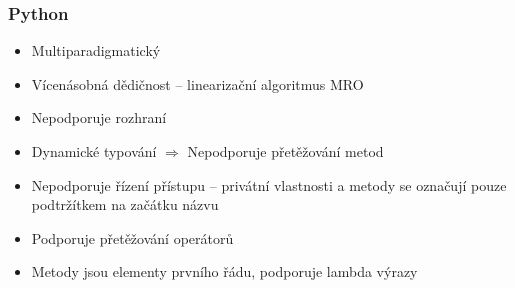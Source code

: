 \documentclass[10pt,a4paper]{article}
\begin{document}
		\subsubsection{Python}
			\begin{itemize}
				\item{Multiparadigmatický}
				\item{Vícenásobná dědičnost -- linearizační algoritmus MRO}
				\item{Nepodporuje rozhraní}
				\item{Dynamické typování $\Rightarrow$ Nepodporuje přetěžování metod}
				\item{Nepodporuje řízení přístupu -- privátní vlastnosti a metody se označují pouze podtržítkem na začátku názvu}
				\item{Podporuje přetěžování operátorů}
				\item{Metody jsou elementy prvního řádu, podporuje lambda výrazy}
			\end{itemize}



\end{document}
